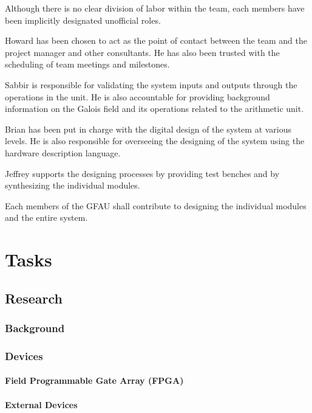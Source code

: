 \documentclass[paper=usletter, fontsize=12pt]{article}
\begin{document}
Although there is no clear division of labor within the team, each members have been implicitly designated unofficial roles.

Howard has been chosen to act as the point of contact between the team and the project manager and other consultants. He has also been trusted with the scheduling of team meetings and milestones.

Sabbir is responsible for validating the system inputs and outputs through the operations in the unit. He is also accountable for providing background information on the Galois field and its operations related to the arithmetic unit.

Brian has been put in charge with the digital design of the system at various levels. He is also responsible for overseeing the designing of the system using the hardware description language.

Jeffrey supports the designing processes by providing test benches and by synthesizing the individual modules.

Each members of the GFAU shall contribute to designing the individual modules and the entire system.

    \section{Tasks}

        \subsection{Research}

        \subsubsection{Background}

        \subsubsection{Devices}

            \paragraph{Field Programmable Gate Array (FPGA)}

            \paragraph{External Devices}
\end{document}
